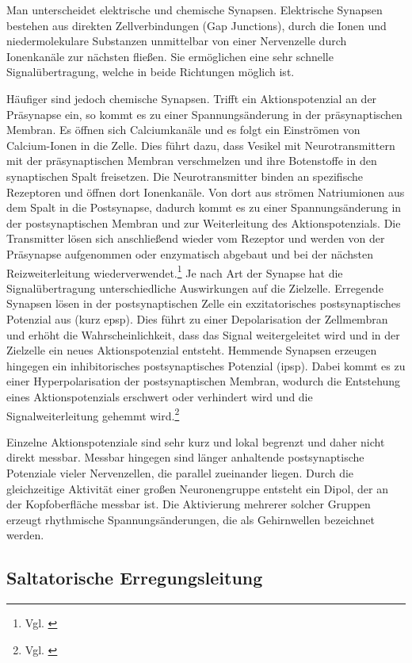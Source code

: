 Man unterscheidet elektrische und chemische Synapsen. Elektrische Synapsen bestehen aus direkten Zellverbindungen (Gap Junctions), durch die Ionen und niedermolekulare Substanzen unmittelbar von einer Nervenzelle durch Ionenkanäle zur nächsten fließen. Sie ermöglichen eine sehr schnelle Signalübertragung, welche in beide Richtungen möglich ist.

Häufiger sind jedoch chemische Synapsen. Trifft ein Aktionspotenzial an der Präsynapse ein, so kommt es zu einer Spannungsänderung in der präsynaptischen Membran. Es öffnen sich Calciumkanäle und es folgt ein Einströmen von Calcium-Ionen in die Zelle. Dies führt dazu, dass Vesikel mit Neurotransmittern mit der präsynaptischen Membran verschmelzen und ihre Botenstoffe in den synaptischen Spalt freisetzen. Die Neurotransmitter binden an spezifische Rezeptoren und öffnen dort Ionenkanäle. Von dort aus strömen Natriumionen aus dem Spalt in die Postsynapse, dadurch kommt es zu einer Spannungsänderung in der postsynaptischen Membran und zur Weiterleitung des Aktionspotenzials. Die Transmitter lösen sich anschließend wieder vom Rezeptor und werden von der Präsynapse aufgenommen oder enzymatisch abgebaut und bei der nächsten Reizweiterleitung wiederverwendet.\footnote{Vgl. \cite{studyflix_synapse}} Je nach Art der Synapse hat die Signalübertragung unterschiedliche Auswirkungen auf die Zielzelle. Erregende Synapsen lösen in der postsynaptischen Zelle ein exzitatorisches postsynaptisches Potenzial aus (kurz \acrshort{epsp}). Dies führt zu einer Depolarisation der Zellmembran und erhöht die Wahrscheinlichkeit, dass das Signal weitergeleitet wird und in der Zielzelle ein neues Aktionspotenzial entsteht. Hemmende Synapsen erzeugen hingegen ein inhibitorisches postsynaptisches Potenzial (\acrshort{ipsp}). Dabei kommt es zu einer Hyperpolarisation der postsynaptischen Membran, wodurch die Entstehung eines Aktionspotenzials erschwert oder verhindert wird und die Signalweiterleitung gehemmt wird.\footnote{Vgl. \cite{deleon2023_gaba}}

Einzelne Aktionspotenziale sind sehr kurz und lokal begrenzt und daher nicht direkt messbar. Messbar hingegen sind länger anhaltende postsynaptische Potenziale vieler Nervenzellen, die parallel zueinander liegen. Durch die gleichzeitige Aktivität einer großen Neuronengruppe entsteht ein Dipol, der an der Kopfoberfläche messbar ist. Die Aktivierung mehrerer solcher Gruppen erzeugt rhythmische Spannungsänderungen, die als Gehirnwellen bezeichnet werden. 

\subsection{Saltatorische Erregungsleitung}

